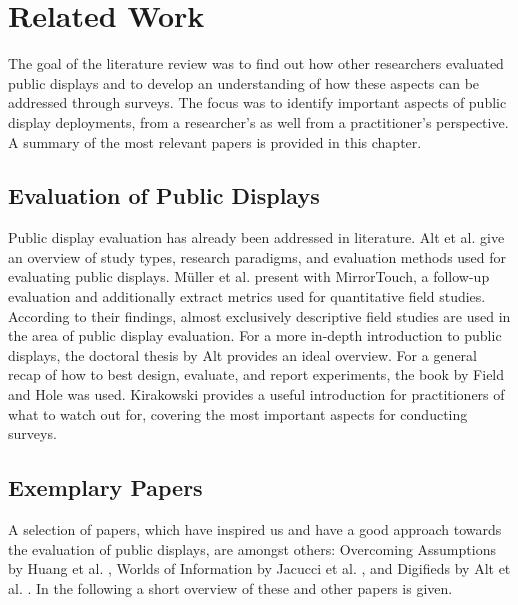 \section{Related Work}
\label{chapter:related-work}

	The goal of the literature review was to find out how other researchers evaluated public displays and to develop an understanding of how these aspects can be addressed through surveys. The focus was to identify important aspects of public display deployments, from a researcher's as well from a practitioner's perspective. A summary of the most relevant papers is provided in this chapter.


	\subsection{Evaluation of Public Displays} %

	Public display evaluation has already been addressed in literature. Alt et al. \cite{Alt2012HowToEvaluate} give an overview of study types, research paradigms, and evaluation methods used for evaluating public displays. M{\"u}ller et al. \cite{muller2014mirrortouch} present with MirrorTouch, a follow-up evaluation and additionally extract metrics used for quantitative field studies. According to their findings, almost exclusively descriptive field studies are used in the area of public display evaluation. For a more in-depth introduction to public displays, the doctoral thesis by Alt \cite{alt2013thesis} provides an ideal overview.
	For a general recap of how to best design, evaluate, and report experiments, the book by Field and Hole \cite{field2003design} was used. Kirakowski \cite{kirakowski2000questionnaireFAQ} provides a useful introduction for practitioners of what to watch out for, covering the most important aspects for conducting surveys.




	\subsection{Exemplary Papers}

	A selection of papers, which have inspired us and have a good approach towards the evaluation of public displays, are amongst others: Overcoming Assumptions by Huang et al. \cite{huang2008overcoming}, Worlds of Information by Jacucci et al. \cite{jacucci2010worldsofinformation}, and Digifieds by Alt et al. \cite{alt2011digifieds}. In the following a short overview of these and other papers is given.


